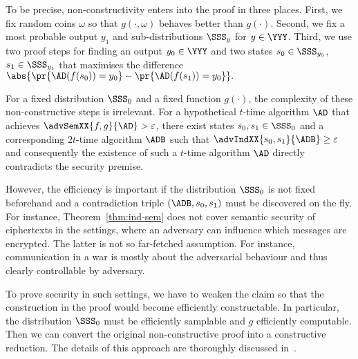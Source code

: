 \documentclass{llncs}
\begin{document}
To be precise, non-constructivity enters into the proof in three
places. First, we fix random coins $\omega$ so that $g(\cdot,\omega)$
behaves better than $g(\cdot)$.  Second, we fix a most probable output
$y_1$ and sub-distributions $\SSS_{y}$ for $y\in\YYY$. Third, we use
two proof steps for finding an output $y_0\in\YYY$ and two states
$s_0\in\SSS_{y_0}$, $s_1\in\SSS_{y_1}$ that maximises the difference
$\abs{\pr{\AD(f(s_0))=y_0}-\pr{\AD(f(s_1))=y_0}}.$

For a fixed distribution $\SSS_0$ and a fixed function $g(\cdot)$, the
complexity of these non-constructive steps is irrelevant. For a
hypothetical $t$-time algorithm $\AD$ that achieves
$\advSemXX{f,g}{\AD}>\varepsilon$, there exist states
$s_0,s_1\in\SSS_0$ and a corresponding $2t$-time algorithm $\ADB$ such
that $\advIndXX{s_0,s_1}{\ADB}\geq \varepsilon$ and consequently the
existence of such a $t$-time algorithm $\AD$ directly contradicts the
security premise.

However, the efficiency is important if the distribution $\SSS_0$ is
not fixed beforehand and a contradiction triple $(\ADB, s_0,s_1)$ must
be discovered on the fly. For instance, Theorem~\ref{thm:ind-sem} does
not cover semantic security of ciphertexts in the settings, where an
adversary can influence which messages are encrypted. The latter is
not so far-fetched assumption. For instance, communication in a war is
mostly about the adversarial behaviour and thus clearly controllable
by adversary.

To prove security in such settings, we have to weaken the claim so
that the construction in the proof would become efficiently
constructable. In particular, the distribution $\SSS_0$ must be
efficiently samplable and $g$ efficiently computable. Then we can
convert the original non-constructive proof into a constructive
reduction. The details of this approach are thoroughly discussed
in~\cite{FOCS1997EXT:Bellare1997}.


\end{document}
